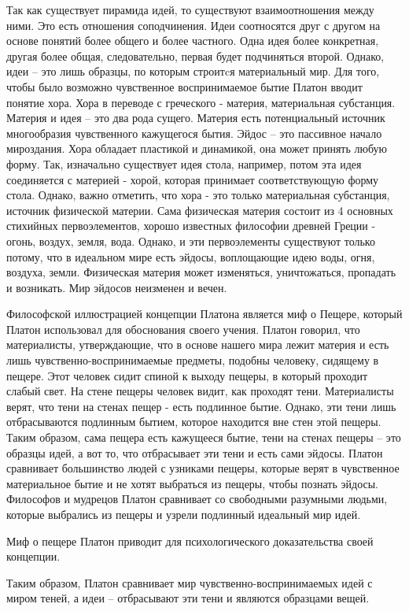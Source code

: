\documentclass[
]{article}
\begin{document}
Так как существует пирамида идей, то существуют взаимоотношения между
ними. Это есть отношения соподчинения. Идеи соотносятся друг с другом на
основе понятий более общего и более частного. Одна идея более
конкретная, другая более общая, следовательно, первая будет подчиняться
второй. Однако, идеи -- это лишь образцы, по которым строитcя
материальный мир. Для того, чтобы было возможно чувственное
воспринимаемое бытие Платон вводит понятие хора. Хора в переводе с
греческого - материя, материальная субстанция. Материя и идея -- это два
рода сущего. Материя есть потенциальный источник многообразия
чувственного кажущегося бытия. Эйдос -- это пассивное начало мироздания.
Хора обладает пластикой и динамикой, она может принять любую форму. Так,
изначально существует идея стола, например, потом эта идея соединяется с
материей - хорой, которая принимает соответствующую форму стола. Однако,
важно отметить, что хора - это только материальная субстанция, источник
физической материи. Сама физическая материя состоит из 4 основных
стихийных первоэлементов, хорошо известных философии древней Греции -
огонь, воздух, земля, вода. Однако, и эти первоэлементы существуют
только потому, что в идеальном мире есть эйдосы, воплощающие идею воды,
огня, воздуха, земли. Физическая материя может изменяться, уничтожаться,
пропадать и возникать. Мир эйдосов неизменен и вечен.

Философской иллюстрацией концепции Платона является миф о Пещере,
который Платон использовал для обоснования своего учения. Платон
говорил, что материалисты, утверждающие, что в основе нашего мира лежит
материя и есть лишь чувственно-воспринимаемые предметы, подобны
человеку, сидящему в пещере. Этот человек сидит спиной к выходу пещеры,
в который проходит слабый свет. На стене пещеры человек видит, как
проходят тени. Материалисты верят, что тени на стенах пещер - есть
подлинное бытие. Однако, эти тени лишь отбрасываются подлинным бытием,
которое находится вне стен этой пещеры. Таким образом, сама пещера есть
кажущееся бытие, тени на стенах пещеры -- это образцы идей, а вот то,
что отбрасывает эти тени и есть сами эйдосы. Платон сравнивает
большинство людей с узниками пещеры, которые верят в чувственное
материальное бытие и не хотят выбраться из пещеры, чтобы познать эйдосы.
Философов и мудрецов Платон сравнивает со свободными разумными людьми,
которые выбрались из пещеры и узрели подлинный идеальный мир идей.

Миф о пещере Платон приводит для психологического доказательства своей
концепции.

Таким образом, Платон сравнивает мир чувственно-воспринимаемых идей с
миром теней, а идеи -- отбрасывают эти тени и являются образцами вещей.
\end{document}

